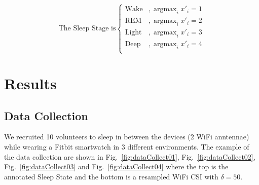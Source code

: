 \documentclass[10pt,letterpaper]{article}
\DeclareMathOperator*{\argmax}{argmax} %
\begin{document}
	
		\begin{equation}
		\text{The Sleep Stage is} \begin{cases}
			\text{Wake} & ,\argmax_i x'_i=1  \\
			\text{REM} & ,\argmax_i x'_i=2  \\
			\text{Light} & ,\argmax_i x'_i=3  \\
			\text{Deep} & ,\argmax_i x'_i=4  \\
		\end{cases}
		\label{eq:SSparserRV}
	\end{equation}	
		
	\section*{Results}
	
	\subsection*{Data Collection}

	We recruited 10 volunteers to sleep in between the devices (2 WiFi anntennae) while wearing a Fitbit smartwatch in 3 different environments. The example of the data collection are shown in Fig.~\ref{fig:dataCollect01}, Fig.~\ref{fig:dataCollect02}, Fig.~\ref{fig:dataCollect03} and Fig.~\ref{fig:dataCollect04} where the top is the annotated Sleep State and the bottom is a resampled WiFi CSI with $\delta = 50$.
	
\end{document}
